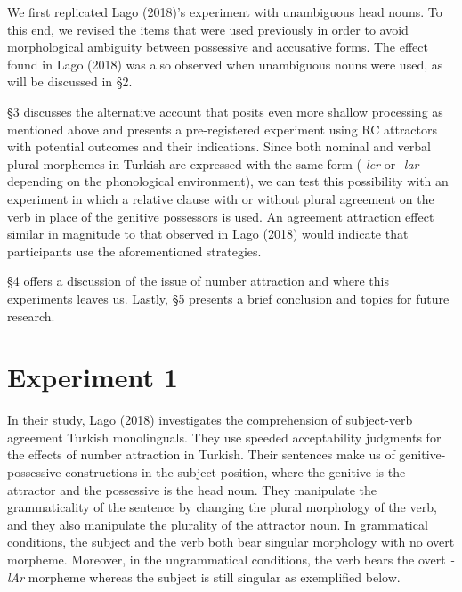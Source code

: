 \documentclass[doc]{apa6}
\begin{document}
We first replicated Lago (2018)'s experiment with unambiguous head
nouns. To this end, we revised the items that were used previously in
order to avoid morphological ambiguity between possessive and accusative
forms. The effect found in Lago (2018) was also observed when
unambiguous nouns were used, as will be discussed in \S 2.

\S 3 discusses the alternative account that posits even more shallow
processing as mentioned above and presents a pre-registered experiment
using RC attractors with potential outcomes and their indications. Since
both nominal and verbal plural morphemes in Turkish are expressed with
the same form (\emph{-ler} or \emph{-lar} depending on the phonological
environment), we can test this possibility with an experiment in which a
relative clause with or without plural agreement on the verb in place of
the genitive possessors is used. An agreement attraction effect similar
in magnitude to that observed in Lago (2018) would indicate that
participants use the aforementioned strategies.

\S 4 offers a discussion of the issue of number attraction and where
this experiments leaves us. Lastly, \S 5 presents a brief conclusion and
topics for future research.

\section{Experiment 1}\label{experiment-1}

In their study, Lago (2018) investigates the comprehension of
subject-verb agreement Turkish monolinguals. They use speeded
acceptability judgments for the effects of number attraction in Turkish.
Their sentences make us of genitive-possessive constructions in the
subject position, where the genitive is the attractor and the possessive
is the head noun. They manipulate the grammaticality of the sentence by
changing the plural morphology of the verb, and they also manipulate the
plurality of the attractor noun. In grammatical conditions, the subject
and the verb both bear singular morphology with no overt morpheme.
Moreover, in the ungrammatical conditions, the verb bears the overt
\emph{-lAr} morpheme whereas the subject is still singular as
exemplified below.
\end{document}
